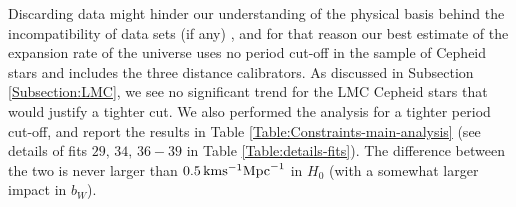 
Discarding data might hinder our understanding of the physical basis behind the incompatibility of data sets (if any) \cite{Press:1996fw}, and for that reason our best estimate of the expansion rate of the universe uses no period cut-off in the sample of Cepheid stars and includes the three distance calibrators.    
As discussed in Subsection \ref{Subsection:LMC}, we see no significant trend for the LMC Cepheid stars that would justify a tighter cut. We also performed the analysis for a tighter period cut-off, and report the results in Table \ref{Table:Constraints-main-analysis} (see details of fits $29,\,34,\,36-39$ in Table \ref{Table:details-fits}).
The difference between the two is never larger than $0.5\, \mathrm{km} \mathrm{s}^{-1} \mathrm{Mpc}^{-1}$ in $H_0$ (with a somewhat larger impact in $b_W$). %

